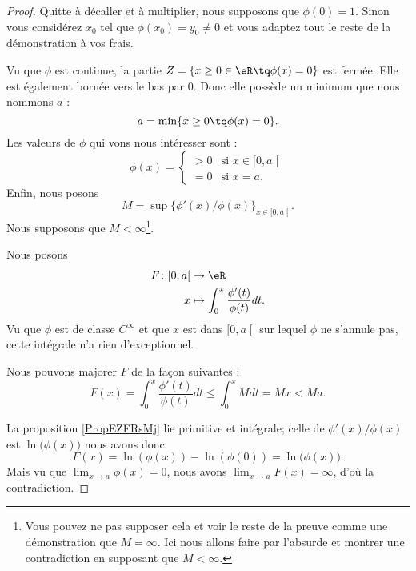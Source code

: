 \begin{proof}
	Quitte à décaller et à multiplier, nous supposons que \( \phi(0)=1\). Sinon vous considérez \( x_0\) tel que \( \phi(x_0)=y_0\neq 0\) et vous adaptez tout le reste de la démonstration à vos frais.

	Vu que \( \phi\) est continue, la partie \( Z=\{ x\geq 0\in \eR\tq \phi(x)=0 \}\) est fermée. Elle est également bornée vers le bas par \( 0\). Donc elle possède un minimum que nous nommons \( a\) :
	\begin{equation}
		a=\min\{ x\geq 0\tq \phi(x)=0 \}.
	\end{equation}
	Les valeurs de \( \phi\) qui vons nous intéresser sont :
	\begin{equation}
		\phi(x)=\begin{cases}
			>0 & \text{si } x\in\mathopen[ 0 , a \mathclose[ \\
			=0 & \text{si }x=a.
		\end{cases}
	\end{equation}
	Enfin, nous posons
	\begin{equation}
		M=\sup\{ \phi'(x)/\phi(x) \}_{x\in\mathopen[ 0 , a \mathclose[}.
	\end{equation}
	Nous supposons que \( M<\infty\)\footnote{Vous pouvez ne pas supposer cela et voir le reste de la preuve comme une démonstration que \( M=\infty\). Ici nous allons faire par l'absurde et montrer une contradiction en supposant que \( M<\infty\).}.

	Nous posons
	\begin{equation}
		\begin{aligned}
			F\colon \mathopen[ 0 , a \mathclose[ & \to \eR                                         \\
			x                                    & \mapsto \int_0^x\frac{ \phi'(t) }{ \phi(t) }dt.
		\end{aligned}
	\end{equation}
	Vu que \( \phi\) est de classe \(  C^{\infty}\) et que \( x\) est dans \( \mathopen[ 0 , a \mathclose[\) sur lequel \( \phi\) ne s'annule pas, cette intégrale n'a rien d'exceptionnel.

	Nous pouvons majorer \( F\) de la façon suivantes :
	\begin{equation}
		F(x)=\int_0^x\frac{ \phi'(t) }{ \phi(t) }dt\leq \int_0^xMdt=Mx< Ma.
	\end{equation}

	La proposition \ref{PropEZFRsMj} lie primitive et intégrale; celle de \( \phi'(x)/\phi(x)\) est \( \ln\big( \phi(x) \big)\) nous avons donc
	\begin{equation}        \label{EQooCEVKooLgXiaj}
		F(x)=\ln(\phi(x))-\ln(\phi(0))=\ln\big( \phi(x) \big).
	\end{equation}
	Mais vu que \( \lim_{x\to a} \phi(x)=0\), nous avons \( \lim_{x\to a} F(x)=\infty\), d'où la contradiction.
\end{proof}

